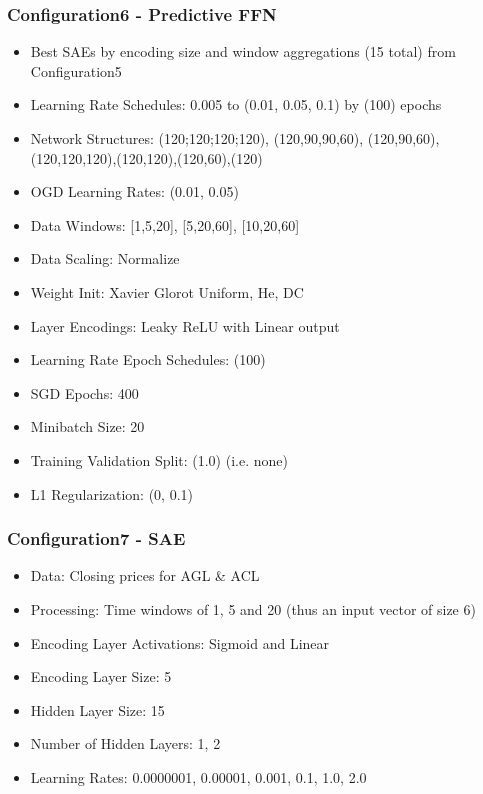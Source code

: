 \documentclass[a4paper,latin]{paper}
\begin{document}
\subsubsection{Configuration6 - Predictive FFN}\label{config6}

\begin{itemize}
	\item Best SAEs by encoding size and window aggregations (15 total) from Configuration5
	\item Learning Rate Schedules: 0.005 to (0.01, 0.05, 0.1) by (100) epochs
	\item Network Structures: (120;120;120;120), (120,90,90,60), (120,90,60),(120,120,120),(120,120),(120,60),(120)
	\item OGD Learning Rates: (0.01, 0.05)
	\item Data Windows: [1,5,20], [5,20,60], [10,20,60]
	\item Data Scaling: Normalize
	\item Weight Init: Xavier Glorot Uniform, He, DC
	\item Layer Encodings: Leaky ReLU with Linear output
	\item Learning Rate Epoch Schedules: (100)
	\item SGD Epochs: 400
	\item Minibatch Size: 20
	\item Training Validation Split: (1.0) (i.e. none)
	\item L1 Regularization: (0, 0.1)
\end{itemize}

\subsubsection{Configuration7 - SAE}\label{config7}

\begin{itemize}
	\item Data: Closing prices for AGL \& ACL
	\item Processing: Time windows of 1, 5 and 20 (thus an input vector of size 6)
	\item Encoding Layer Activations: Sigmoid and Linear
	\item Encoding Layer Size: 5
	\item Hidden Layer Size: 15
	\item Number of Hidden Layers: 1, 2
	\item Learning Rates: 0.0000001, 0.00001, 0.001, 0.1, 1.0, 2.0
\end{itemize}
\end{document}
